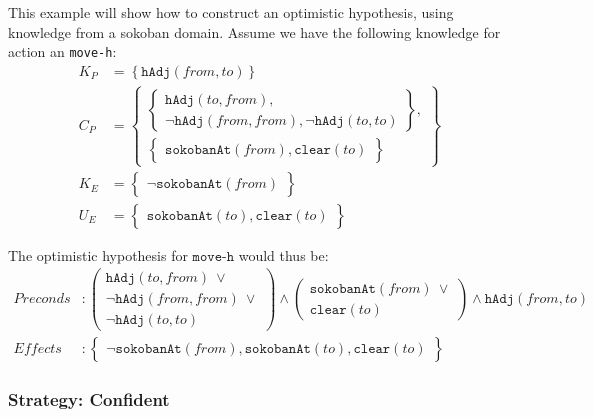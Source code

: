 \documentclass[../Master.tex]{subfiles}
\begin{document}
	\begin{example}
		This example will show how to construct an optimistic hypothesis, using knowledge from a sokoban domain.
		Assume we have the following knowledge for action an \texttt{move-h}:
		 	\begin{equation*}
			 	\begin{split}
				 	K_P & = \left\{\texttt{hAdj}(from, to) \right\} \\
					C_P& =	\left\{
							\begin{gathered}
								\left\{
								\begin{gathered}
									\texttt{hAdj}(to, from), \\
									\neg\texttt{hAdj}(from, from), \neg\texttt{hAdj}(to, to)
								\end{gathered}
								\right\},	\\ \left\{
								\begin{gathered}
									\texttt{sokobanAt}(from), \texttt{clear}(to)
								\end{gathered}
								\right\}
							\end{gathered}
							\right\}
				 	\\
				 	K_E& =
						 	\left\{
						 	\begin{gathered}
							 	\neg\texttt{sokobanAt}(from)
						 	\end{gathered}
						 	\right\}
					\\
				 	U_E& =
					 	\left\{
					 	\begin{gathered}
						 	\texttt{sokobanAt}(to),
						 	\texttt{clear}(to)
					 	\end{gathered}
					 	\right\}
				\end{split}
		 	\end{equation*}

		The optimistic hypothesis for $\texttt{move-h}$ would thus be:
			\begin{equation*}
				\begin{split}
					Preconds& :\left(
									 \begin{gathered}
									   \texttt{hAdj}(to, from) ~ \lor \\
									  \neg\texttt{hAdj}(from, from) ~ \lor \\ \neg\texttt{hAdj}(to, to)
									 \end{gathered}
								  \right) \land
								  \left(
									  \begin{gathered}
										  \texttt{sokobanAt}(from) ~ \lor \\ \texttt{clear}(to)
									  \end{gathered}
								  \right) \land \texttt{hAdj}(from, to) \\
					Effects &: 	\left\{
									\begin{gathered}
										\neg\texttt{sokobanAt}(from),
										\texttt{sokobanAt}(to),
										\texttt{clear}(to)
									\end{gathered}
								\right\}
				\end{split}
			\end{equation*}
	\end{example}

\subsubsection{Strategy: Confident}
\end{document}
